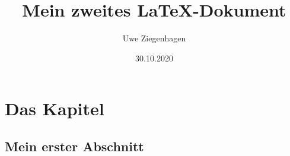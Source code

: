 \documentclass[ngerman,12pt]{scrreprt}
\author{Uwe Ziegenhagen}
\title{Mein zweites \LaTeX-Dokument}
\date{30.10.2020}
\begin{document}
\maketitle

\tableofcontents

\listoffigures

\listoftables

\chapter{Das Kapitel}

\section{Mein erster Abschnitt}

\blindtext[10]
\end{document}
